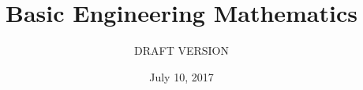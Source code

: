 \documentclass[a4paper,fleqn,12pt]{article}
\title{Basic Engineering Mathematics}
\author{DRAFT VERSION}
\date{July 10, 2017}
\begin{document}
\maketitle
\pagebreak

\pagebreak
\tableofcontents

\end{document}
